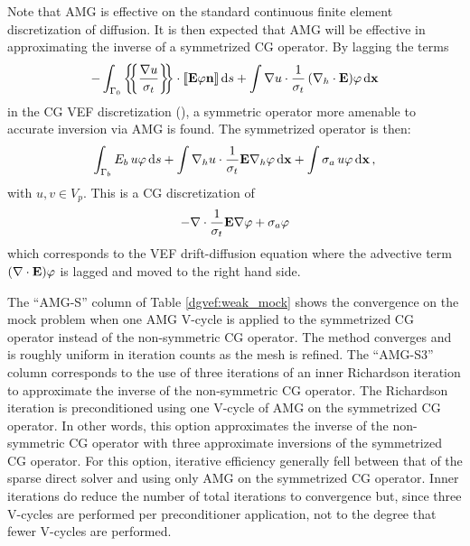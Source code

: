 \documentclass[../doc.tex]{subfiles}
\begin{document}
Note that AMG is effective on the standard continuous finite element discretization of diffusion. It is then expected that AMG will be effective in approximating the inverse of a symmetrized CG operator. By lagging the terms 
	\begin{equation}
		-\int_{\Gamma_0} \left\{\!\!\left\{\frac{\nabla u}{\sigma_t}\right\}\!\!\right\}\cdot \left\llbracket\boldsymbol{\mathrm{E}}\varphi\boldsymbol{\mathrm{n}} \right\rrbracket \mathop{}\!\mathrm{d} s + \int \nabla u \cdot \frac{1}{\sigma_t} \left( \nabla_h\cdot\boldsymbol{\mathrm{E}} \right)\!\varphi \mathop{}\!\mathrm{d} \boldsymbol{\mathrm{x}}
	\end{equation}
in the CG VEF discretization (), a symmetric operator more amenable to accurate inversion via AMG is found. The symmetrized operator is then:
	\begin{equation}
		\int_{\Gamma_b} E_b\, u \varphi \mathop{}\!\mathrm{d} s + \int \nabla_h u \cdot \frac{1}{\sigma_t}\boldsymbol{\mathrm{E}} \nabla_h \varphi \mathop{}\!\mathrm{d} \boldsymbol{\mathrm{x}} + \int \sigma_a\, u \varphi \mathop{}\!\mathrm{d} \boldsymbol{\mathrm{x}} \,, 
	\end{equation}
with $u,v \in V_p$. 
This is a CG discretization of 
	\begin{equation}
		-\nabla \cdot \frac{1}{\sigma_t}\boldsymbol{\mathrm{E}}\nabla \varphi + \sigma_a \varphi 
	\end{equation} 
which corresponds to the VEF drift-diffusion equation where the advective term $\left( \nabla\cdot\boldsymbol{\mathrm{E}} \right)\!\varphi$ is lagged and moved to the right hand side. 

The ``AMG-S'' column of Table \ref{dgvef:weak_mock} shows the convergence on the mock problem when one AMG V-cycle is applied to the symmetrized CG operator instead of the non-symmetric CG operator. The method converges and is roughly uniform in iteration counts as the mesh is refined. The ``AMG-S3'' column corresponds to the use of three iterations of an inner Richardson iteration to approximate the inverse of the non-symmetric CG operator. The Richardson iteration is preconditioned using one V-cycle of AMG on the symmetrized CG operator. In other words, this option approximates the inverse of the non-symmetric CG operator with three approximate inversions of the symmetrized CG operator. For this option, iterative efficiency generally fell between that of the sparse direct solver and using only AMG on the symmetrized CG operator. Inner iterations do reduce the number of total iterations to convergence but, since three V-cycles are performed per preconditioner application, not to the degree that fewer V-cycles are performed.
\end{document}
